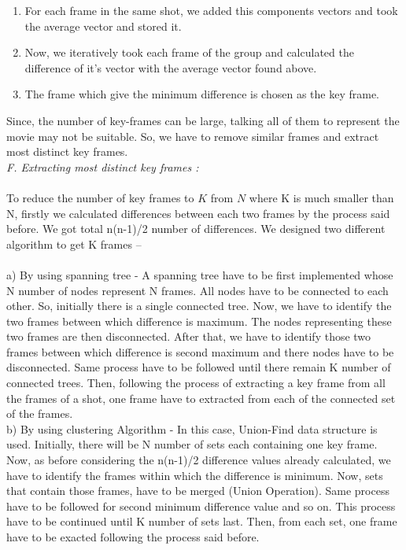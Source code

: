 \documentclass[twocolumn,twoside]{article}
\begin{document}
\begin{enumerate}[i]
		\item {For each frame in the same shot, we added this components vectors and took the average vector and stored it.}
		\item {Now, we iteratively took each frame of the group and calculated the difference of it's vector with the average vector found above.}
		\item {The frame which give the minimum difference is chosen as the key frame.}
\end{enumerate}

Since, the number of key-frames can be large, talking all of them to represent the movie may not be suitable. So, we have to remove similar frames and extract most distinct key frames.\\


		\vspace{0.4cm}
		\textit{F. Extracting most distinct key frames :}\\ \\ 
		
To reduce the number of key frames to $K$ from $N$ where K is much smaller than N, firstly we calculated differences between each two frames by the process said before. We got total n(n-1)/2 number of differences. We designed two different algorithm to get K frames --\\ \\
		\vspace{0.1cm}
a) By using spanning tree - 
		A spanning tree have to be first implemented whose N number of nodes represent N frames. All nodes have to be connected to each other. So, initially there is a single connected tree. Now, we have to identify the two frames between which difference is maximum. The nodes representing these two frames are then disconnected. After that, we have to identify those two frames between which difference is second maximum and there nodes have to be disconnected. Same process have to be followed until there remain K number of connected trees. Then, following the process of extracting a key frame from all the frames of a shot, one frame have to extracted from each of the connected set of the frames.\\

b) By using clustering Algorithm - 
		In this case, Union-Find data structure is used. Initially, there will be N number of sets each containing one key frame. Now, as before considering the n(n-1)/2 difference values already calculated, we have to identify the frames within which the difference is minimum. Now, sets that contain those frames, have to be merged (Union Operation).  Same process have to be followed for second minimum difference value and so on. This process have to be continued until K number of sets last. Then, from each set, one frame have to be exacted following the process said before.
		
\end{document}
